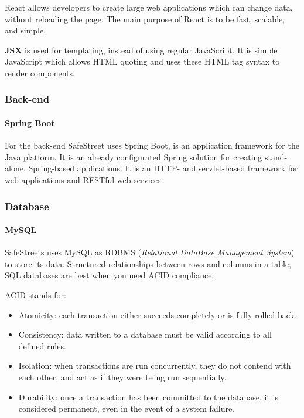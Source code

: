 React allows developers to create large web applications which can change data, without reloading the page. The main purpose of React is to be fast, scalable, and simple.

\textbf{JSX} is used for templating, instead of using regular JavaScript. It is simple JavaScript which allows HTML quoting and uses these HTML tag syntax to render components.

\subsubsection{Back-end}

\paragraph{Spring Boot}

For the back-end SafeStreet uses Spring Boot, is an application framework for the Java platform.
It is an already configurated Spring solution for creating stand-alone, Spring-based applications. It is an HTTP- and servlet-based framework for web applications and RESTful web services.

\subsubsection{Database}

\paragraph{MySQL}

SafeStreets uses MySQL as RDBMS (\textit{Relational DataBase Management System}) to store its data.
Structured relationships between rows and columns in a table, SQL databases are best when you need ACID compliance. 

ACID stands for:
\begin{itemize}
	\item Atomicity: each transaction either succeeds completely or is fully rolled back.
	\item Consistency: data written to a database must be valid according to all defined rules.
	\item Isolation:  when transactions are run concurrently, they do not contend with each other, and act as if they were being run sequentially.
	\item Durability: once a transaction has been committed to the database, it is considered permanent, even in the event of a system failure.
\end{itemize}






